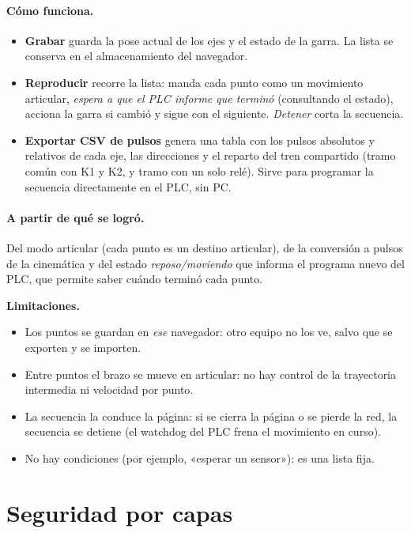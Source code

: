 \documentclass[a4paper,11pt]{article}
\newcommand{\limite}[1]{\par\smallskip\noindent\colorbox{rojo!8}{\parbox{\dimexpr\linewidth-2\fboxsep}{\textbf{\color{rojo}Limitaciones.} #1}}\par\smallskip}
\begin{document}
\paragraph{Cómo funciona.}
\begin{itemize}
\item \textbf{Grabar} guarda la pose actual de los ejes y el estado de la garra. La lista se conserva en el almacenamiento del navegador.
\item \textbf{Reproducir} recorre la lista: manda cada punto como un movimiento articular, \emph{espera a que el PLC informe que terminó} (consultando el estado), acciona la garra si cambió y sigue con el siguiente. \emph{Detener} corta la secuencia.
\item \textbf{Exportar CSV de pulsos} genera una tabla con los pulsos absolutos y relativos de cada eje, las direcciones y el reparto del tren compartido (tramo común con K1 y K2, y tramo con un solo relé). Sirve para programar la secuencia directamente en el PLC, sin PC.
\end{itemize}

\paragraph{A partir de qué se logró.} Del modo articular (cada punto es un destino articular), de la conversión a pulsos de la cinemática y del estado \emph{reposo/moviendo} que informa el programa nuevo del PLC, que permite saber cuándo terminó cada punto.

\limite{\begin{itemize}[leftmargin=5mm, topsep=0pt]
\item Los puntos se guardan en \emph{ese} navegador: otro equipo no los ve, salvo que se exporten y se importen.
\item Entre puntos el brazo se mueve en articular: no hay control de la trayectoria intermedia ni velocidad por punto.
\item La secuencia la conduce la página: si se cierra la página o se pierde la red, la secuencia se detiene (el watchdog del PLC frena el movimiento en curso).
\item No hay condiciones (por ejemplo, «esperar un sensor»): es una lista fija.
\end{itemize}}

\section{Seguridad por capas}
\end{document}
